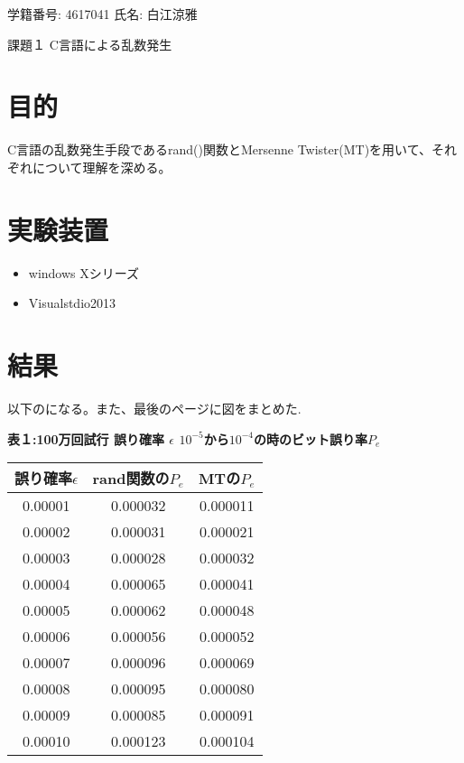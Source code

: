 \documentclass[12pt]{jarticle}
\begin{document}
\begin{center}
  学籍番号: 4617041 氏名: 白江涼雅
\end{center}

{\LARGE 課題１ C言語による乱数発生}

\section{目的}
C言語の乱数発生手段であるrand()関数とMersenne Twister(MT)を用いて、それぞれについて理解を深める。

\section{実験装置}
\begin{itemize}
 \item windows Xシリーズ
 \item Visualstdio2013
\end{itemize}
 
\section{結果}
以下のになる。また、最後のページに図をまとめた.
\begin{center}
  \textbf{表１:100万回試行 誤り確率 $\epsilon$ $10^{-5}$から$10^{-4}$の時のビット誤り率$P_e$}
  \begin{tabular}{|c|c|c|} \hline
    誤り確率$\epsilon$ & rand関数の$P_e$ & MTの$P_e$ \\ \hline
    0.00001          & 0.000032       & 0.000011  \\ \hline
    0.00002          & 0.000031       & 0.000021  \\ \hline
    0.00003          & 0.000028       & 0.000032  \\ \hline
    0.00004          & 0.000065       & 0.000041  \\ \hline
    0.00005          & 0.000062       & 0.000048  \\ \hline
    0.00006          & 0.000056       & 0.000052  \\ \hline
    0.00007          & 0.000096       & 0.000069  \\ \hline
    0.00008          & 0.000095       & 0.000080  \\ \hline
    0.00009          & 0.000085       & 0.000091  \\ \hline
    0.00010          & 0.000123       & 0.000104  \\ \hline
  \end{tabular}
\end{center}
\end{document}
